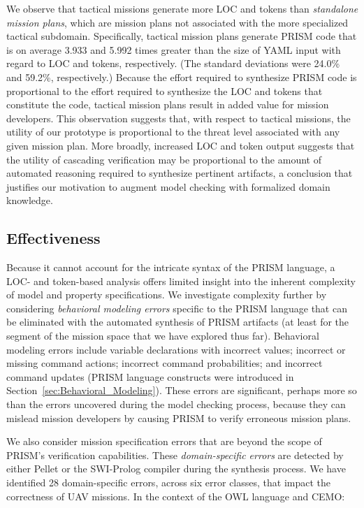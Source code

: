 We observe that tactical missions generate more LOC and tokens than \emph{standalone mission plans}, which are mission plans not associated with the more specialized tactical subdomain. Specifically, tactical mission plans generate PRISM code that is on average 3.933 and 5.992 times greater than the size of YAML input with regard to LOC and tokens, respectively. (The standard deviations were 24.0\% and 59.2\%, respectively.) Because the effort required to synthesize PRISM code is proportional to the effort required to synthesize the LOC and tokens that constitute the code, tactical mission plans result in added value for mission developers. This observation suggests that, with respect to tactical missions, the utility of our prototype is proportional to the threat level associated with any given mission plan. More broadly, increased LOC and token output suggests that the utility of cascading verification may be proportional to the amount of automated reasoning required to synthesize pertinent artifacts, a conclusion that justifies our motivation to augment model checking with formalized domain knowledge.

\subsection{Effectiveness}

\noindent Because it cannot account for the intricate syntax of the PRISM language, a LOC- and token-based analysis offers limited insight into the inherent complexity of model and property specifications. We investigate complexity further by considering \emph{behavioral modeling errors} specific to the PRISM language that can be eliminated with the automated synthesis of PRISM artifacts (at least for the segment of the mission space that we have explored thus far). Behavioral modeling errors include variable declarations with incorrect values; incorrect or missing command actions; incorrect command probabilities; and incorrect command updates (PRISM language constructs were introduced in Section~\ref{sec:Behavioral_Modeling}). These errors are significant, perhaps more so than the errors uncovered during the model checking process, because they can mislead mission developers by causing PRISM to verify erroneous mission plans.

We also consider mission specification errors that are beyond the scope of PRISM's verification capabilities. These \emph{domain-specific errors} are detected by either Pellet or the SWI-Prolog compiler during the synthesis process. We have identified 28 domain-specific errors, across six error classes, that impact the correctness of UAV missions. In the context of the OWL language and CEMO:

